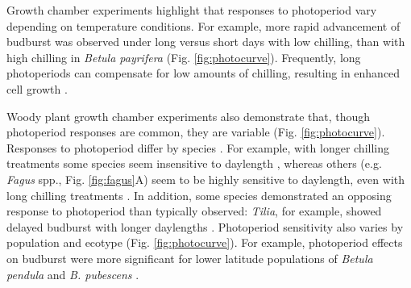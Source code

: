 \documentclass{article}
\begin{document}
\par Growth chamber experiments highlight that responses to photoperiod vary depending on temperature conditions. For example, more rapid advancement of budburst was observed under long versus short days with low chilling, than with high chilling in \emph{Betula payrifera} \citep{Hawkins:2012} (Fig. \ref{fig:photocurve}). %
Frequently, long photoperiods can compensate for low amounts of chilling, resulting in enhanced cell growth \citep{Heide:1993,Myking:1995,Caffarra:2011b}.%
\par Woody plant growth chamber experiments also demonstrate that, though photoperiod responses are common, they are variable (Fig. \ref{fig:photocurve}). Responses to photoperiod differ by species \citep[e.g.,][]{Basler:2012, Basler:2014aa,flynn2018,Heide:1993a,Howe:1996,zohner2016}.
For example, with longer chilling treatments some species seem insensitive to daylength \citep[e.g., \emph{Hammamelis} spp., \emph{Prunus} spp.,][]{zohner2016}, %
whereas others (e.g. \emph{Fagus} spp., Fig. \ref{fig:fagus}A) seem to be highly sensitive to daylength, even with long chilling treatments \citep{zohner2016}. In addition, some species demonstrated an opposing response to photoperiod than typically observed: \emph{Tilia}, for example, showed delayed budburst with longer daylengths \citep[Fig. \ref{fig:photocurve},][]{Ashby:1962aa}. %
Photoperiod sensitivity also varies by population and ecotype \citep[e.g.,][]{Partanen:2005aa} (Fig. \ref{fig:photocurve}). For example, photoperiod effects on budburst were more significant for lower latitude populations of \emph{Betula pendula} and \emph{B. pubescens} \citep{Partanen:2005aa}. 
\end{document}

